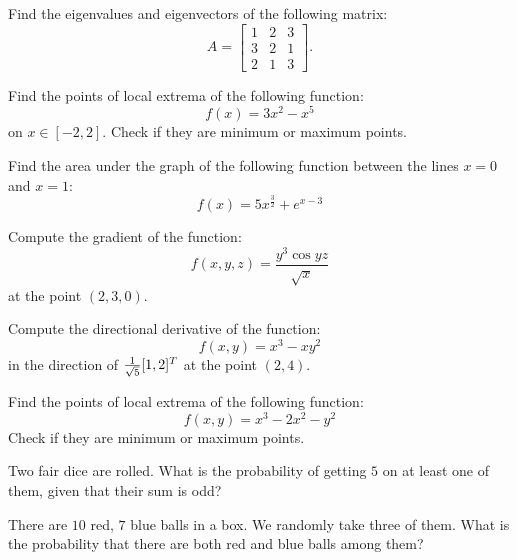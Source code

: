 \begin{problem}
Find the eigenvalues and eigenvectors of the following matrix:
\[ A = \begin{bmatrix}
1&2&3\\3&2&1\\2&1&3
\end{bmatrix}. \]
\end{problem}
\medskip


\begin{problem}
Find the points of local extrema of the following function:
\[ f(x) =3x^2-x^5\]
on $x\in [-2,2]$. Check if they are minimum or maximum points.
\end{problem}
\medskip



\begin{problem}
Find the area under the graph of the following function between the lines $x=0$ and $x=1$:
\[ f(x) =5x^{\frac{3}{2}}+e^{x-3}\]
\end{problem}
\medskip



\begin{problem}
Compute the gradient of the function:
\[ f(x,y,z) = \dfrac{y^3\cos{yz}}{\sqrt{x}} \]
at the point $(2,3,0)$.
\end{problem}
\medskip



\begin{problem}
Compute the directional derivative of the function:
\[ f(x,y) = x^3 - xy^2 \]
in the direction of ${1\over\sqrt{5}} [1,2]^T$ at the point $(2, 4)$.
\end{problem}
\medskip

\begin{problem}
Find the points of local extrema of the following function:
\[f(x, y) = x^3 - 2x^2 - y^2\]
Check if they are minimum or maximum points.
\end{problem}
\medskip



\begin{problem}
Two fair dice are rolled. What is the probability of getting $5$ on at least one of them, given that their sum is odd?
\end{problem}
\medskip


\begin{problem}
There are $10$ red, $7$ blue balls in a box. We randomly take three of them. What is the probability that there are both red and blue balls among them?
\end{problem}
\medskip

